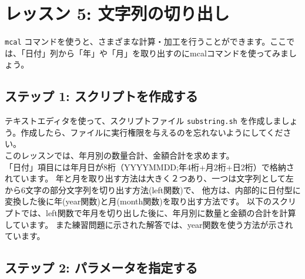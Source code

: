 

%
\section{レッスン 5: 文字列の切り出し}

\verb|mcal| コマンドを使うと、さまざまな計算・加工を行うことができます。ここでは、「日付」列から「年」や「月」を取り出すのにmcalコマンドを使ってみましょう。

\subsection{ステップ 1: スクリプトを作成する}

テキストエディタを使って、スクリプトファイル \verb|substring.sh| を作成しましょう。作成したら、ファイルに実行権限を与えるのを忘れないようにしてください。\\

このレッスンでは、年月別の数量合計、金額合計を求めます。\\


「日付」項目には年月日が8桁（YYYYMMDD;年4桁+月2桁+日2桁）で格納されています。
年と月を取り出す方法は大きく２つあり、一つは文字列として左から6文字の部分文字列を切り出す方法(left関数)で、
他方は、内部的に日付型に変換した後に年(year関数)と月(month関数)を取り出す方法です。
以下のスクリプトでは、left関数で年月を切り出した後に、年月別に数量と金額の合計を計算しています。
また練習問題に示された解答では、year関数を使う方法が示されています。


 \subsection{ステップ 2: パラメータを指定する}

